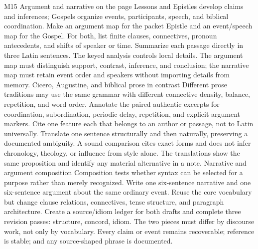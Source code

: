 \begin{courseunit}{M15}
\SubmoduleExtension
  {Argument and narrative on the page}
  {Lessons and Epistles develop claims and inferences; Gospels organize events,
  participants, speech, and biblical coordination.}
  {Make an argument map for the packet Epistle and an event/speech map for the
  Gospel.  For both, list finite clauses, connectives, pronoun antecedents, and
  shifts of speaker or time.}
  {Summarize each passage directly in three Latin sentences.}
  {The keyed analysis controls local details.  The argument map must distinguish
  support, contrast, inference, and conclusion; the narrative map must retain
  event order and speakers without importing details from memory.}
\SubmoduleExtension
  {Cicero, Augustine, and biblical prose in contrast}
  {Different prose traditions may use the same grammar with different
  connective density, balance, repetition, and word order.}
  {Annotate the paired authentic excerpts for coordination, subordination,
  periodic delay, repetition, and explicit argument markers.  Cite one feature
  each that belongs to an author or passage, not to Latin universally.}
  {Translate one sentence structurally and then naturally, preserving a
  documented ambiguity.}
  {A sound comparison cites exact forms and does not infer chronology,
  theology, or influence from style alone.  The translations show the same
  proposition and identify any material alternative in a note.}
\SubmoduleExtension
  {Narrative and argument composition}
  {Composition tests whether syntax can be selected for a purpose rather than
  merely recognized.}
  {Write one six-sentence narrative and one six-sentence argument about the
  same ordinary event.  Reuse the core vocabulary but change clause relations,
  connectives, tense structure, and paragraph architecture.}
  {Create a source/idiom ledger for both drafts and complete three revision
  passes: structure, concord, idiom.}
  {The two pieces must differ by discourse work, not only by vocabulary.
  Every claim or event remains recoverable; reference is stable; and any
  source-shaped phrase is documented.}
\end{courseunit}

